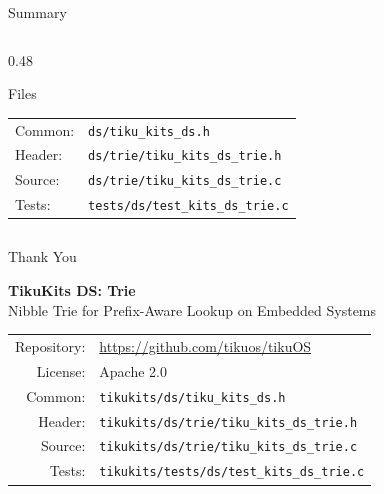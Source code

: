 \documentclass[aspectratio=169, 10pt]{beamer}
\begin{document}
\begin{frame}{Summary}
\begin{columns}[T]
\begin{column}{0.48\textwidth}
\begin{block}{Files}
\scriptsize
\begin{tabular}{@{}lp{4.5cm}@{}}
Common: & \texttt{ds/tiku\_kits\_ds.h} \\
Header: & \texttt{ds/trie/tiku\_kits\_ds\_trie.h} \\
Source: & \texttt{ds/trie/tiku\_kits\_ds\_trie.c} \\
Tests:  & \texttt{tests/ds/test\_kits\_ds\_trie.c} \\
\end{tabular}
\end{block}
\end{column}
\end{columns}
\end{frame}

\begin{frame}{Thank You}
\begin{center}
\Large\textbf{TikuKits DS: Trie}\\[0.5em]
\normalsize Nibble Trie for Prefix-Aware Lookup on Embedded Systems\\[1.5em]

\begin{tabular}{rl}
  Repository: & \url{https://github.com/tikuos/tikuOS} \\
  License:    & Apache 2.0 \\
  Common:     & \texttt{tikukits/ds/tiku\_kits\_ds.h} \\
  Header:     & \texttt{tikukits/ds/trie/tiku\_kits\_ds\_trie.h} \\
  Source:     & \texttt{tikukits/ds/trie/tiku\_kits\_ds\_trie.c} \\
  Tests:      & \texttt{tikukits/tests/ds/test\_kits\_ds\_trie.c} \\
\end{tabular}
\end{center}
\end{frame}
\end{document}
